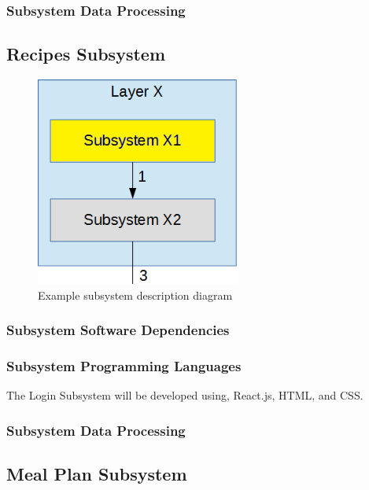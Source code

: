 \subsubsection{Subsystem Data Processing}

\subsection{Recipes Subsystem}

\begin{figure}[h!]
	\centering
 	\includegraphics[width=0.60\textwidth]{images/subsystem}
 \caption{Example subsystem description diagram}
\end{figure}

\subsubsection{Subsystem Software Dependencies}

\subsubsection{Subsystem Programming Languages}
The Login Subsystem will be developed using, React.js, HTML, and CSS.

\subsubsection{Subsystem Data Processing}

\subsection{Meal Plan Subsystem}

